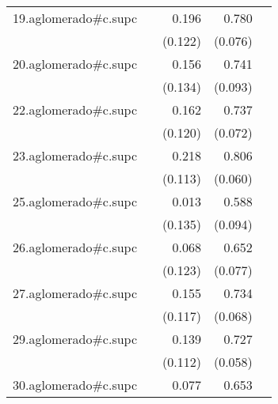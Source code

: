 {\begin{longtable}{l*{4}{D{.}{.}{-1}}}
\addlinespace
19.aglomerado#c.supc&                     &       0.196         &       0.780\sym{***}&                     \\
            &                     &     (0.122)         &     (0.076)         &                     \\
\addlinespace
20.aglomerado#c.supc&                     &       0.156         &       0.741\sym{***}&                     \\
            &                     &     (0.134)         &     (0.093)         &                     \\
\addlinespace
22.aglomerado#c.supc&                     &       0.162         &       0.737\sym{***}&                     \\
            &                     &     (0.120)         &     (0.072)         &                     \\
\addlinespace
23.aglomerado#c.supc&                     &       0.218         &       0.806\sym{***}&                     \\
            &                     &     (0.113)         &     (0.060)         &                     \\
\addlinespace
25.aglomerado#c.supc&                     &       0.013         &       0.588\sym{***}&                     \\
            &                     &     (0.135)         &     (0.094)         &                     \\
\addlinespace
26.aglomerado#c.supc&                     &       0.068         &       0.652\sym{***}&                     \\
            &                     &     (0.123)         &     (0.077)         &                     \\
\addlinespace
27.aglomerado#c.supc&                     &       0.155         &       0.734\sym{***}&                     \\
            &                     &     (0.117)         &     (0.068)         &                     \\
\addlinespace
29.aglomerado#c.supc&                     &       0.139         &       0.727\sym{***}&                     \\
            &                     &     (0.112)         &     (0.058)         &                     \\
\addlinespace
30.aglomerado#c.supc&                     &       0.077         &       0.653\sym{***}&                     \\

\end{longtable}}
